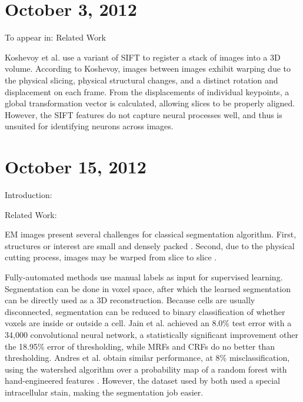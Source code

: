 \documentclass[draft,english]{article}
\newcommand{\+}[1]{\ensuremath{\boldsymbol{\mathrm{#1}}}}
\begin{document}
\section*{October 3, 2012}
To appear in: Related Work


Koshevoy et al. \cite{Koshevoy2006} use a variant of SIFT \cite{Lowe2004} to register a stack of images into a 3D volume. According to Koshevoy, images between images exhibit warping due to the physical slicing, physical structural changes, and a distinct rotation and displacement on each frame. From the displacements of individual keypoints, a global transformation vector is calculated, allowing slices to be properly aligned. However, the SIFT features do not capture neural processes well, and thus is unsuited for identifying neurons across images.

\section*{October 15, 2012}
Introduction:

Related Work:

EM images present several challenges for classical segmentation algorithm. First, structures or interest are small and densely packed \cite{Jain2007}. Second, due to the physical cutting process, images may be warped from slice to slice \cite{Koshevoy2006}.


Fully-automated methods use manual labels as input for supervised learning. Segmentation can be done in voxel space, after which the learned segmentation can be directly used as a 3D reconstruction. Because cells are usually disconnected, segmentation can be reduced to binary classification of whether voxels are inside or outside a cell. Jain et al. \cite{Jain2007} achieved an 8.0\% test error with a 34,000 convolutional neural network, a statistically significant improvement other the 18.95\% error of thresholding, while MRFs and CRFs do no better than thresholding. Andres et al. obtain similar performance, at 8\% misclassification, using the watershed algorithm over a probability map of a random forest with hand-engineered features \cite{Andres2008, Gonzales2008}. However, the dataset used by both used a special intracellular stain, making the segmentation job easier.
\end{document}
